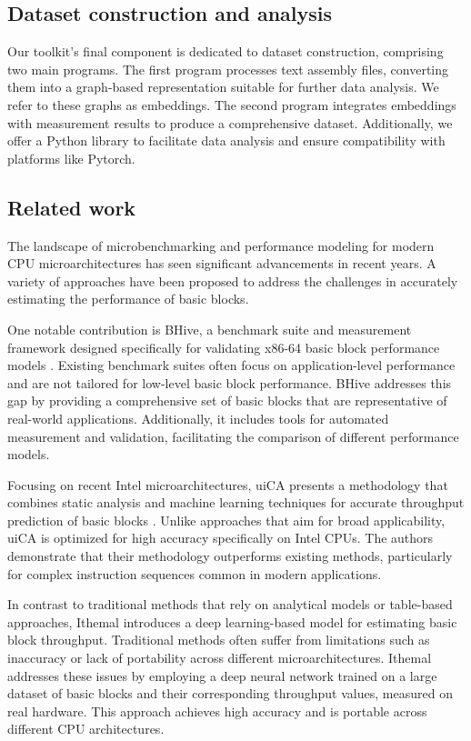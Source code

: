 \subsection{Dataset construction and analysis}

Our toolkit's final component is dedicated to dataset construction, comprising two main programs. 
The first program processes text assembly files, converting them into a graph-based representation 
suitable for further data analysis. We refer to these graphs as embeddings. 
The second program integrates embeddings with measurement results to produce a comprehensive dataset. 
Additionally, we offer a Python library to facilitate data analysis and ensure compatibility with 
platforms like Pytorch.

\subsection{Related work}

The landscape of microbenchmarking and performance modeling for modern CPU microarchitectures has 
seen significant advancements in recent years. A variety of approaches have been proposed to address 
the challenges in accurately estimating the performance of basic blocks.

One notable contribution is BHive, a benchmark suite and measurement framework designed specifically 
for validating x86-64 basic block performance models \cite{chenBHiveBenchmarkSuite2019}. Existing 
benchmark suites often focus on application-level performance and are not tailored for low-level 
basic block performance. BHive addresses this gap by providing a comprehensive set of basic blocks 
that are representative of real-world applications. Additionally, it includes tools for automated 
measurement and validation, facilitating the comparison of different performance models.

Focusing on recent Intel microarchitectures, uiCA presents a methodology that combines static analysis
and machine learning techniques for accurate throughput prediction of basic 
blocks \cite{abelUiCAAccurateThroughput2022}. Unlike approaches that aim for broad applicability, 
uiCA is optimized for high accuracy specifically on Intel CPUs. The authors demonstrate that their 
methodology outperforms existing methods, particularly for complex instruction sequences common in 
modern applications.

In contrast to traditional methods that rely on analytical models or table-based approaches, Ithemal 
introduces a deep learning-based model for estimating basic block throughput. Traditional methods 
often suffer from limitations such as inaccuracy or lack of portability across different microarchitectures.
Ithemal addresses these issues by employing a deep neural network trained on a large dataset of basic
blocks and their corresponding throughput values, measured on real hardware. This approach achieves high 
accuracy and is portable across different CPU architectures.

